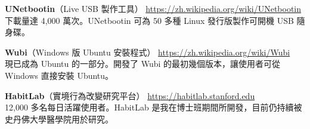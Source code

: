 
\textbf{UNetbootin}（Live USB 製作工具） \hfill \url{https://zh.wikipedia.org/wiki/UNetbootin}\\ %
\textcolor{sectcol}{下載量達 4,000 萬次。}UNetbootin 可為 50 多種 Linux 發行版製作可開機 USB 隨身碟。\\ %

\vspace{-1mm}

\textbf{Wubi}（Windows 版 Ubuntu 安裝程式） \hfill \url{https://zh.wikipedia.org/wiki/Wubi}\\ %
\textcolor{sectcol}{現已成為 Ubuntu 的一部分。}開發了 Wubi 的最初幾個版本，讓使用者可從 Windows 直接安裝 Ubuntu。\\ %

\vspace{-1mm}

\textbf{HabitLab}（實境行為改變研究平台） \hfill \url{https://habitlab.stanford.edu}\\ %
\textcolor{sectcol}{12,000 多名每日活躍使用者。}HabitLab 是我在博士班期間所開發，目前仍持續被史丹佛大學醫學院用於研究。\\ %

